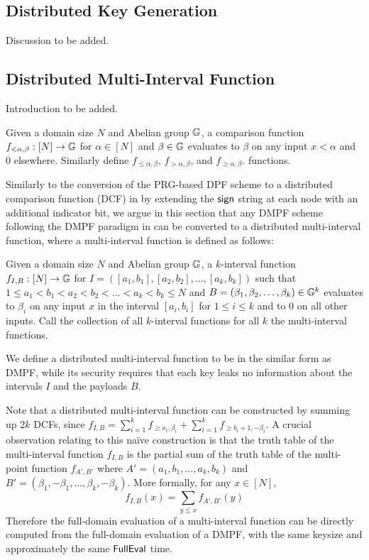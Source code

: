 \subsection{Distributed Key Generation}
Discussion to be added. 

\subsection{Distributed Multi-Interval Function}
Introduction to be added. 

\begin{definition}
  Given a domain size $N$ and Abelian group $\mathbb{G}$, a comparison function $f_{<\alpha,\beta}:[N]\rightarrow \mathbb{G}$ for $\alpha\in[N]$ and $\beta\in \mathbb{G}$ evaluates to $\beta$ on any input $x<\alpha$ and 0 elsewhere. Similarly define $f_{\le \alpha, \beta}$, $f_{>\alpha,\beta}$, and $f_{\ge \alpha,\beta}$. functions. 
\end{definition}

Similarly to the conversion of the PRG-based DPF scheme to a distributed comparison function (DCF) in \cite{10.1007/978-3-662-46803-6_12} by extending the ${\sf sign}$ string at each node with an additional indicator bit, we argue in this section that any DMPF scheme following the DMPF paradigm in  can be converted to a distributed multi-interval function, where a multi-interval function is defined as follows: 
\begin{definition}
  Given a domain size $N$ and Abelian group $\mathbb{G}$, a $k$-interval function $f_{I,B}:[N]\rightarrow \mathbb{G}$ for $I = \left([a_1,b_1], [a_2,b_2], \dots, [a_k,b_k]\right)$ such that $1\le a_1<b_1<a_2<b_2<\dots<a_k<b_k\le N$ and $B = (\beta_1,\beta_2,\dots,\beta_k)\in \mathbb{G}^k$ evaluates to $\beta_i$ on any input $x$ in the interval $[a_i,b_i]$ for $1\le i\le k$ and to $0$ on all other inputs. Call the collection of all $k$-interval functions for all $k$ the multi-interval functions. 
\end{definition}
We define a distributed multi-interval function to be in the similar form as DMPF, while its security requires that each key leaks no information about the intervals $I$ and the payloads $B$. 

Note that a distributed multi-interval function can be constructed by summing up $2k$ DCFs, since $f_{I,B} = \sum_{i=1}^k f_{\ge a_i,\beta_i} + \sum_{i=1}^k f_{\ge b_i+1, -\beta_i}$. A crucial observation relating to this na\"ive construction is that the truth table of the multi-interval function $f_{I,B}$ is the partial sum of the truth table of the multi-point function $f_{A',B'}$ where $A' = (a_1,b_1,\dots,a_k,b_k)$ and $B' = (\beta_1,-\beta_1,\dots,\beta_k,-\beta_k)$. More formally, for any $x\in[N]$, 
\[
  f_{I,B}(x) = \sum_{y\le x}f_{A',B'}(y)
\]
Therefore the full-domain evaluation of a multi-interval function can be directly computed from the full-domain evaluation of a DMPF, with the same keysize and approximately the same ${\sf FullEval}$ time. 

